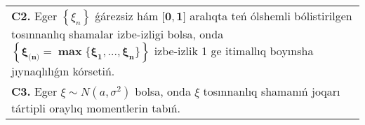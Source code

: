 \documentclass{article}
\begin{document}
\begin{tabular}{m{17cm}}
 \\
\textbf{C2.} Eger \(\left\{ \xi_{n} \right\}\) ǵárezsiz hám \(\mathbf{\lbrack 0,1\rbrack}\) aralıqta teń ólshemli bólistirilgen tosınnanlıq shamalar izbe-izligi bolsa, onda \(\left\{ \mathbf{\xi}_{\mathbf{(}\mathbf{n}\mathbf{)}}\mathbf{=}\mathbf{\max}\mathbf{\{}\mathbf{\xi}_{\mathbf{1}}\mathbf{,...,}\mathbf{\xi}_{\mathbf{n}}\mathbf{\}} \right\}\) izbe-izlik 1 ge itimallıq boyınsha jıynaqlılıǵın kórsetiń.
 \\
\textbf{C3.} Eger \(\xi\sim N\left( a,\sigma^{2} \right)\) bolsa, onda \(\xi\) tosınnanlıq shamanıń joqarı tártipli oraylıq momentlerin tabıń.
 \\

\end{tabular}
\vspace{1cm}
\end{document}
